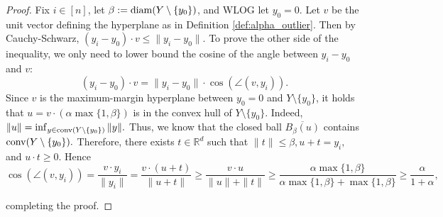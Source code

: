 \begin{proof}
    Fix $i \in [n]$, let ${\beta := \operatorname*{diam}(Y\setminus \{y_0\})}$, and WLOG let $y_0 = 0.$ Let $v$ be the unit vector defining the hyperplane as in Definition \ref{def:alpha_outlier}. Then by Cauchy-Schwarz, $(y_i-y_0) \cdot v \leq \| y_i-y_0 \|.$ To prove the other side of the inequality, we only need to lower bound the cosine of the angle between $y_i-y_0$ and $v$:
    $$(y_i - y_0)\cdot v = \| y_i - y_0 \| \cdot \cos(\angle({v, y_i})).$$
    Since $v$ is the maximum-margin hyperplane between $y_0=0$ and $Y\setminus \{y_0\}$, it holds that $u = v \cdot (\alpha \max\{1, \beta\})$ is in the convex hull of $Y\setminus \{y_0\}.$ Indeed, $\| u \| = \inf_{y \in \operatorname*{conv}(Y\setminus \{y_0\})} \| y \|.$ Thus, we know that the closed ball $\overline{B_\beta (u)}$ contains $\operatorname*{conv}(Y\setminus\{y_0\}).$ Therefore, there exists $t \in \mathbb{R}^d$ such that $\| t \| \leq \beta, u + t = y_i,$ and $u\cdot t \geq 0$. Hence
    $$\cos(\angle(v, y_i)) = \frac{v \cdot y_i}{\lVert y_i \rVert} = \frac{v\cdot(u+t)}{{\|u+t\|}} { \geq \frac{v\cdot u}{\|u\| + \|t\|}} \geq \frac{\alpha \max\{1,\beta\}}{{\alpha\max\{1,\beta\} + \max\{1, \beta\}}} \geq \frac{\alpha}{{1+\alpha}%
    },$$
    
   completing the proof.
\end{proof}


